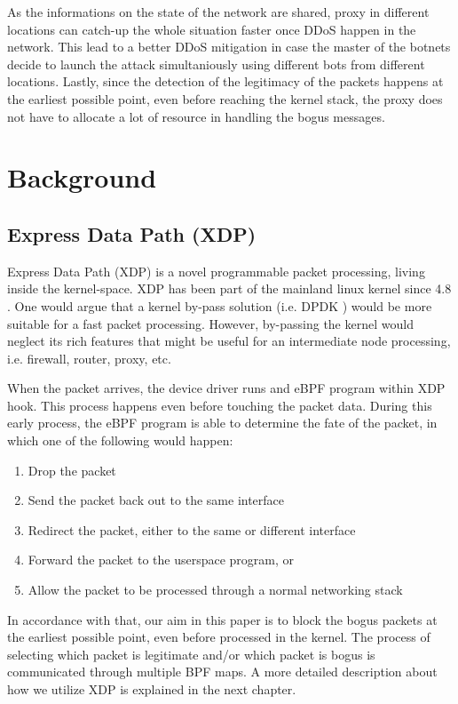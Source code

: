 \documentclass[sigplan,screen]{acmart}
\begin{document}
As the informations on the state of the network are shared, proxy in different locations can catch-up the whole situation faster once DDoS happen in the network. This lead to a better DDoS mitigation in case the master of the botnets decide to launch the attack simultaniously using different bots from different locations. Lastly, since the detection of the legitimacy of the packets happens at the earliest possible point, even before reaching the kernel stack, the proxy does not have to allocate a lot of resource in handling the bogus messages. 

\section{Background}
\subsection{Express Data Path (XDP)}
Express Data Path (XDP) \cite{10.1145/3281411.3281443} is a novel programmable packet processing, living inside the kernel-space. XDP has been part of the mainland linux kernel since 4.8 \cite{xdp_kern}. One would argue that a kernel by-pass solution (i.e. DPDK \cite{dpdk}) would be more suitable for a fast packet processing. However, by-passing the kernel would neglect its rich features that might be useful for an intermediate node processing, i.e. firewall, router, proxy, etc. 


When the packet arrives, the device driver runs and eBPF program within XDP hook. This process happens even before touching the packet data. During this early process, the eBPF program is able to determine the fate of the packet, in which one of the following would happen:
\begin{enumerate}
\item Drop the packet
\item Send the packet back out to the same interface
\item Redirect the packet, either to the same or different interface
\item Forward the packet to the userspace program, or
\item Allow the packet to be processed through a normal networking stack
\end{enumerate}
In accordance with that, our aim in this paper is to block the bogus packets at the earliest possible point, even before processed in the kernel. The process of selecting which packet is legitimate and/or which packet is bogus is communicated through multiple BPF maps. A more detailed description about how we utilize XDP is explained in the next chapter. 
\end{document}

